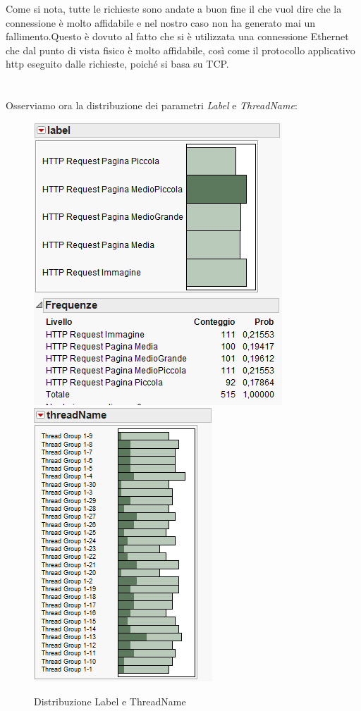 		Come si nota, tutte le richieste sono andate a buon fine il che 	vuol dire che la connessione è molto affidabile e nel nostro caso non ha generato mai un fallimento.Questo è dovuto al fatto che si è utilizzata una connessione Ethernet che dal punto di vista fisico è molto affidabile, così come il protocollo applicativo http eseguito dalle richieste, poiché si basa su TCP.\\\\\\
		Osserviamo ora la distribuzione dei parametri \textit{Label} e \textit{ThreadName}:
		
		\begin{figure}[H]
			\centering
			\includegraphics[scale=0.7]{./immagine/label.png}\quad\includegraphics[scale=0.96]{./immagine/threadname.png}
			\caption{Distribuzione Label e ThreadName}
			\label{fig:label_threadname}
		\end{figure}
		
